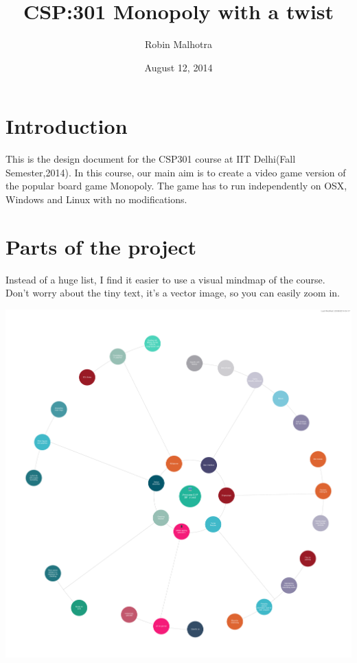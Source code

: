 \documentclass[a4paper,12pt]{article}
\begin{document}
\title{CSP:301  Monopoly with a twist}
\author{Robin Malhotra}
\date{August 12, 2014}
\maketitle
\tableofcontents
\clearpage

\section{Introduction}

This is the design document for the CSP301 course at IIT Delhi(Fall Semester,2014).
In this course, our main aim is to create a video game version of the popular board game Monopoly. The game has to run independently on OSX, Windows and Linux with no modifications.



\section{Parts of the project}
Instead of a huge list, I find it easier to use a visual mindmap of the course. Don't worry about the tiny text, it's a vector image, so you can easily zoom in.

\includegraphics[width=\textwidth]{mindly.pdf}
\end{document}
